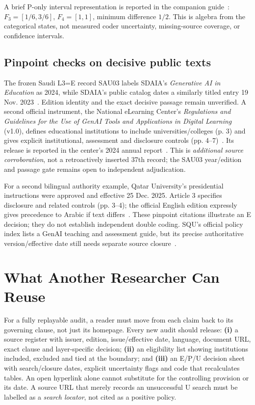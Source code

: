 \documentclass[conference,letterpaper]{IEEEtran}
\begin{document}
A brief P-only interval representation is reported in the companion guide~\cite{petry,pekala}: $F_3=[1/6,3/6]$, $F_4=[1,1]$, minimum difference $1/2$. This is algebra from the categorical states, not measured coder uncertainty, missing-source coverage, or confidence intervals.

\subsection{Pinpoint checks on decisive public texts}
The frozen Saudi L3=E record SAU03 labels SDAIA's \emph{Generative AI in Education} as 2024, while SDAIA's public catalog dates a similarly titled entry 19 Nov. 2023~\cite{sdaiacat}. Edition identity and the exact decisive passage remain unverified. A second official instrument, the National eLearning Center's \emph{Regulations and Guidelines for the Use of GenAI Tools and Applications in Digital Learning} (v1.0), defines educational institutions to include universities/colleges (p. 3) and gives explicit institutional, assessment and disclosure controls (pp. 4--7)~\cite{nelcguide}. Its release is reported in the center's 2024 annual report~\cite{nelcreport}. This is \emph{additional source corroboration}, not a retroactively inserted 37th record; the SAU03 year/edition and passage gate remains open to independent adjudication.

For a second bilingual authority example, Qatar University's presidential instructions were approved and effective 25 Dec. 2025. Article 3 specifies disclosure and related controls (pp. 3--4); the official English edition expressly gives precedence to Arabic if text differs~\cite{qataru}. These pinpoint citations illustrate an E decision; they do not establish independent double coding. SQU's official policy index lists a GenAI teaching and assessment guide, but its precise authoritative version/effective date still needs separate source closure~\cite{squ}.

\section{What Another Researcher Can Reuse}
For a fully replayable audit, a reader must move from each claim back to its governing clause, not just its homepage. Every new audit should release: \textbf{(i)} a source register with issuer, edition, issue/effective date, language, document URL, exact clause and layer-specific decision; \textbf{(ii)} an eligibility list showing institutions included, excluded and tied at the boundary; and \textbf{(iii)} an E/P/U decision sheet with search/closure dates, explicit uncertainty flags and code that recalculates tables. An open hyperlink alone cannot substitute for the controlling provision or its date. A source URL that merely records an unsuccessful U search must be labelled as a \emph{search locator}, not cited as a positive policy.
\end{document}
